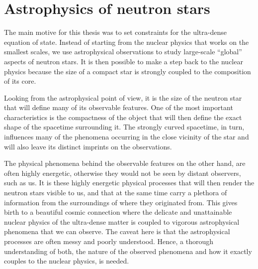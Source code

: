 \chapter{Astrophysics of neutron stars}


The main motive for this thesis was to set constraints for the ultra-dense equation of state.
Instead of starting from the nuclear physics that works on the smallest scales, we use astrophysical observations to study large-scale ``global'' aspects of neutron stars.
It is then possible to make a step back to the nuclear physics because the size of a compact star is strongly coupled to the composition of its core.

Looking from the astrophysical point of view, it is the size of the neutron star that will define many of its observable features.
One of the most important characteristics is the compactness of the object that will then define the exact shape of the spacetime surrounding it.
The strongly curved spacetime, in turn, influences many of the phenomena occurring in the close vicinity of the star and will also leave its distinct imprints on the observations.

The physical phenomena behind the observable features on the other hand, are often highly energetic, otherwise they would not be seen by distant observers, such as us.
It is these highly energetic physical processes that will then render the neutron stars visible to us, and that at the same time carry a plethora of information from the surroundings of where they originated from.
This gives birth to a beautiful cosmic connection where the delicate and unattainable nuclear physics of the ultra-dense matter is coupled to vigorous astrophysical phenomena that we can observe.
The caveat here is that the astrophysical processes are often messy and poorly understood.
Hence, a thorough understanding of both, the nature of the observed phenomena and how it exactly couples to the nuclear physics, is needed.

